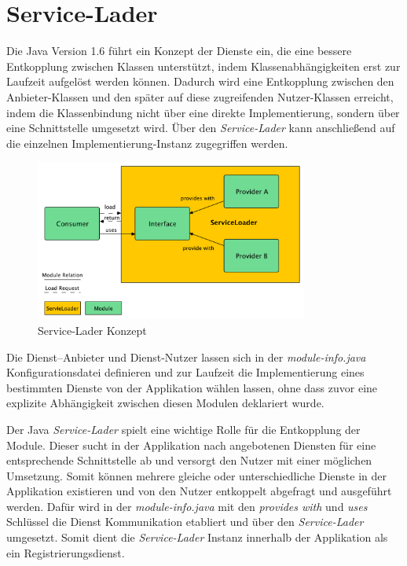   \section{Service-Lader} \label{sec:servLoad} 
    Die Java Version 1.6 führt ein Konzept der Dienste ein, die eine bessere Entkopplung zwischen Klassen unterstützt, indem Klassenabhängigkeiten erst zur Laufzeit aufgelöst werden können. Dadurch wird eine Entkopplung zwischen den Anbieter-Klassen und den später auf diese zugreifenden Nutzer-Klassen erreicht, indem die Klassenbindung nicht über eine direkte Implementierung, sondern über eine Schnittstelle umgesetzt wird. Über den \textit{Service-Lader} kann anschließend auf die einzelnen Implementierung-Instanz zugegriffen werden. \bigbreak
    \begin{figure}[h!]
      \centering
      \includegraphics[width=0.8\textwidth]{material/images/ServiceLoadingMulti.pdf}
      \caption{Service-Lader Konzept}
      \label{fig:serviceLoaderMulti}
    \end{figure}
    Die Dienst–Anbieter und Dienst-Nutzer lassen sich in der \textit{module-info.java} Konfigurationsdatei definieren und zur Laufzeit die Implementierung eines bestimmten Dienste von der Applikation wählen lassen, ohne dass zuvor eine explizite Abhängigkeit zwischen diesen Modulen deklariert wurde. \bigbreak

    Der Java \textit{Service-Lader} spielt eine wichtige Rolle für die Entkopplung der Module. Dieser sucht in der Applikation nach angebotenen Diensten für eine entsprechende Schnittstelle ab und versorgt den Nutzer mit einer möglichen Umsetzung. Somit können mehrere gleiche oder unterschiedliche Dienste in der Applikation existieren und von den Nutzer entkoppelt abgefragt und ausgeführt werden. Dafür wird in der \textit{module-info.java} mit den \textit{provides with} und \textit{uses} Schlüssel die Dienst Kommunikation etabliert und über den \textit{Service-Lader} umgesetzt. Somit dient die \textit{Service-Lader} Instanz innerhalb der Applikation als ein Registrierungsdienst.\bigbreak



